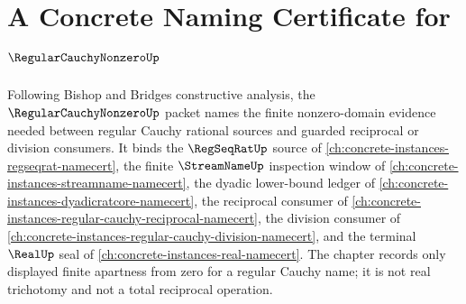 \chapter{A Concrete Naming Certificate for $\RegularCauchyNonzeroUp$}
\label{ch:concrete-instances-regular-cauchy-nonzero-namecert}

Following Bishop and Bridges constructive analysis, the $\RegularCauchyNonzeroUp$ packet names the finite nonzero-domain evidence needed between regular Cauchy rational sources and guarded reciprocal or division consumers. It binds the $\RegSeqRatUp$ source of \autoref{ch:concrete-instances-regseqrat-namecert}, the finite $\StreamNameUp$ inspection window of \autoref{ch:concrete-instances-streamname-namecert}, the dyadic lower-bound ledger of \autoref{ch:concrete-instances-dyadicratcore-namecert}, the reciprocal consumer of \autoref{ch:concrete-instances-regular-cauchy-reciprocal-namecert}, the division consumer of \autoref{ch:concrete-instances-regular-cauchy-division-namecert}, and the terminal $\RealUp$ seal of \autoref{ch:concrete-instances-real-namecert}. The chapter records only displayed finite apartness from zero for a regular Cauchy name; it is not real trichotomy and not a total reciprocal operation.

